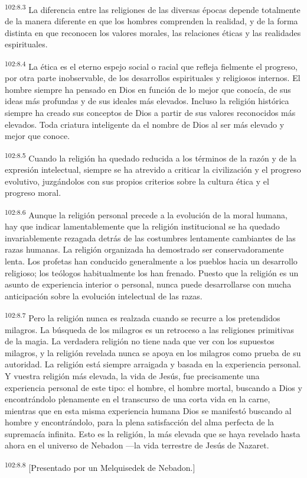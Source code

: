 \par
\textsuperscript{102:8.3} La diferencia entre las religiones de las diversas épocas depende totalmente de la manera diferente en que los hombres comprenden la realidad, y de la forma distinta en que reconocen los valores morales, las relaciones éticas y las realidades espirituales.

\par
\textsuperscript{102:8.4} La ética es el eterno espejo social o racial que refleja fielmente el progreso, por otra parte inobservable, de los desarrollos espirituales y religiosos internos. El hombre siempre ha pensado en Dios en función de lo mejor que conocía, de sus ideas más profundas y de sus ideales más elevados. Incluso la religión histórica siempre ha creado sus conceptos de Dios a partir de sus valores reconocidos más elevados. Toda criatura inteligente da el nombre de Dios al ser más elevado y mejor que conoce.

\par
\textsuperscript{102:8.5} Cuando la religión ha quedado reducida a los términos de la razón y de la expresión intelectual, siempre se ha atrevido a criticar la civilización y el progreso evolutivo, juzgándolos con sus propios criterios sobre la cultura ética y el progreso moral.

\par
\textsuperscript{102:8.6} Aunque la religión personal precede a la evolución de la moral humana, hay que indicar lamentablemente que la religión institucional se ha quedado invariablemente rezagada detrás de las costumbres lentamente cambiantes de las razas humanas. La religión organizada ha demostrado ser conservadoramente lenta. Los profetas han conducido generalmente a los pueblos hacia un desarrollo religioso; los teólogos habitualmente los han frenado. Puesto que la religión es un asunto de experiencia interior o personal, nunca puede desarrollarse con mucha anticipación sobre la evolución intelectual de las razas.

\par
\textsuperscript{102:8.7} Pero la religión nunca es realzada cuando se recurre a los pretendidos milagros. La búsqueda de los milagros es un retroceso a las religiones primitivas de la magia. La verdadera religión no tiene nada que ver con los supuestos milagros, y la religión revelada nunca se apoya en los milagros como prueba de su autoridad. La religión está siempre arraigada y basada en la experiencia personal. Y vuestra religión más elevada, la vida de Jesús, fue precisamente una experiencia personal de este tipo: el hombre, el hombre mortal, buscando a Dios y encontrándolo plenamente en el transcurso de una corta vida en la carne, mientras que en esta misma experiencia humana Dios se manifestó buscando al hombre y encontrándolo, para la plena satisfacción del alma perfecta de la supremacía infinita. Esto es la religión, la más elevada que se haya revelado hasta ahora en el universo de Nebadon ---la vida terrestre de Jesús de Nazaret.

\par
\textsuperscript{102:8.8} [Presentado por un Melquisedek de Nebadon.]